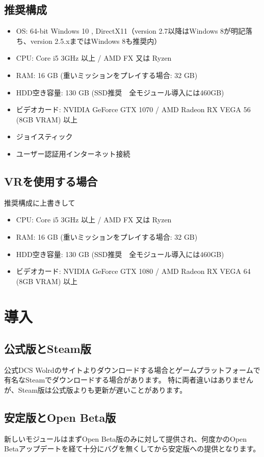 \subsection{推奨構成}
\begin{itemize}
  \item OS: 64-bit Windows 10 , DirectX11（version 2.7以降はWindows 8が明記落ち、version 2.5.xまではWindows 8も推奨内）
  \item CPU: Core i5 3GHz 以上 / AMD FX 又は Ryzen
  \item RAM: 16 GB (重いミッションをプレイする場合: 32 GB)
  \item HDD空き容量: 130 GB (SSD推奨　全モジュール導入には460GB)
  \item ビデオカード: NVIDIA GeForce GTX 1070 / AMD Radeon RX VEGA 56 (8GB VRAM) 以上
  \item ジョイスティック
  \item ユーザー認証用インターネット接続
\end{itemize}

\subsection{VRを使用する場合}
推奨構成に上書きして
\begin{itemize}
  \item CPU: Core i5 3GHz 以上 / AMD FX 又は Ryzen
  \item RAM: 16 GB (重いミッションをプレイする場合: 32 GB)
  \item HDD空き容量: 130 GB (SSD推奨　全モジュール導入には460GB)
  \item ビデオカード: NVIDIA GeForce GTX 1080 / AMD Radeon RX VEGA 64 (8GB VRAM) 以上
\end{itemize}

\section{導入}
\subsection{公式版とSteam版}
公式DCS Wolrdのサイトよりダウンロードする場合とゲームプラットフォームで有名なSteamでダウンロードする場合があります。
特に両者違いはありませんが、Steam版は公式版よりも更新が遅いことがあります。

\subsection{安定版とOpen Beta版}
新しいモジュールはまずOpen Beta版のみに対して提供され、何度かのOpen Betaアップデートを経て十分にバグを無くしてから安定版への提供となります。
  

